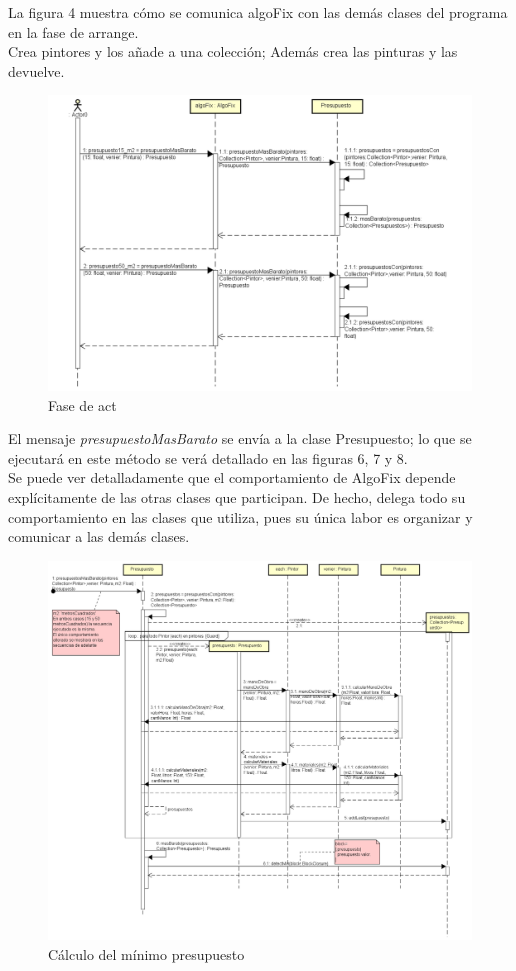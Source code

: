 \documentclass[titlepage,a4paper]{article}
\begin{document}
La figura 4 muestra cómo se comunica algoFix con las demás clases del programa en la fase de arrange.\\
Crea pintores y los añade a una colección; Además crea las pinturas y las devuelve.


\begin{figure}[H]
\centering
\includegraphics[width=1.1\textwidth]{Secuencia2ACT.png}
\caption{\label{fig:seq02} Fase de act}
\end{figure}

El mensaje \textit{presupuestoMasBarato} se envía a la clase Presupuesto; lo que se ejecutará en este método se verá detallado en las figuras 6, 7 y 8.\\

Se puede ver detalladamente que el comportamiento de AlgoFix depende explícitamente de las otras clases que participan. De hecho, delega todo su comportamiento en las clases que utiliza,
pues su única labor es organizar y comunicar a las demás clases. 


\begin{figure}[H]
\centering
\includegraphics[width=1.1\textwidth]{Secuencia3CalcularPresupuestoGRAL.png}
\caption{\label{fig:seq02} Cálculo del mínimo presupuesto}
\end{figure}
\end{document}
